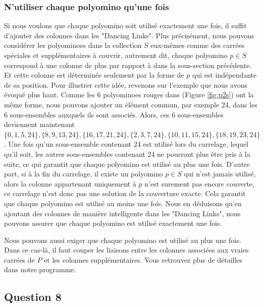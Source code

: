 \documentclass[a4paper,12pt]{article}
\begin{document}
\subsubsection{N'utiliser chaque polyomino qu'une fois}
Si nous voulons que chaque polyomino soit utilisé exactement une fois, il suffit d'ajouter des colonnes dans les "Dancing Links". Plus précisément, nous pouvons considérer les polyominoes dans la collection $S$ eux-mêmes comme des carrées spéciales et supplémentaires à couvrir, autrement dit, chaque polyomino $p\in S$ correspond à une colonne de plus par rapport à dans la sous-section précédente. Et cette colonne est déterminée seulement par la forme de $p$ qui est indépendante de sa position. Pour illustrer cette idée, revenons sur l'exemple que nous avons évoqué plus haut. Comme les 6 polyominoes rouges dans (Figure \ref{fig:p2s}) ont la même forme, nous pouvons ajouter un élément commun, par exemple 24, dans les 6 sous-ensembles auxquels ils sont associés. Alors, ces 6 sous-ensembles deviennent maintenant $\{0,1,5,24\},\{8,9,13,24\},\{16,17,21,24\},\{2,3,7,24\},\{10,11,15,24\},\{18,19,23,24\}$. Une fois qu'un sous-ensemble contenant 24 est utilisé lors du carrelage, lequel qu'il soit, les autres sous-ensembles contenant 24 ne pourront plus être pris à la suite, ce qui garantit que chaque polyomino est utilisé au plus une fois. D'autre part, si à la fin du carrelage, il existe un polyomino $p\in S$ qui n'est jamais utilisé, alors la colonne appartenant uniquement à $p$ n'est surement pas encore couverte, ce carrelage n'est donc pas une solution de la couverture exacte. Cela garantit que chaque polyomino est utilisé au moins une fois. Nous en déduisons qu'en ajoutant des colonnes de manière intelligente dans les "Dancing Links", nous pouvons assurer que chaque polyomino est utilisé exactement une fois. 

Nous pouvons aussi exiger que chaque polyomino est utilisé au plus une fois. Dans ce cas-là, il faut couper les liaisons entre les colonnes associées aux vraies carrées de $P$ et les colonnes supplémentaires. Vous retrouvez plus de détailles dans notre programme.

\subsection{Question 8}
\end{document}
